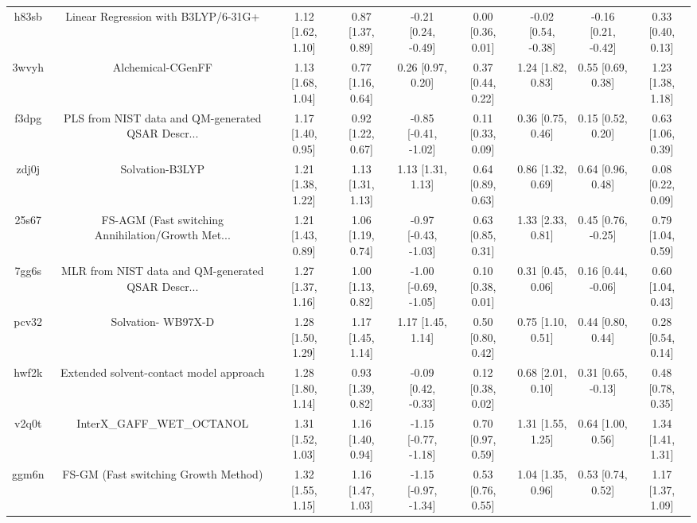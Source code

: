 \documentclass{article}
\begin{document}
\begin{center}
\begin{longtable}{|ccccccccc|}
 h83sb &                Linear Regression with B3LYP/6-31G+ &  1.12 [1.62, 1.10] &  0.87 [1.37, 0.89] &   -0.21 [0.24, -0.49] &  0.00 [0.36, 0.01] &   -0.02 [0.54, -0.38] &   -0.16 [0.21, -0.42] &     0.33 [0.40, 0.13] \\
 3wvyh &                                  Alchemical-CGenFF &  1.13 [1.68, 1.04] &  0.77 [1.16, 0.64] &     0.26 [0.97, 0.20] &  0.37 [0.44, 0.22] &     1.24 [1.82, 0.83] &     0.55 [0.69, 0.38] &     1.23 [1.38, 1.18] \\
 f3dpg &  PLS from NIST data and QM-generated QSAR Descr... &  1.17 [1.40, 0.95] &  0.92 [1.22, 0.67] &  -0.85 [-0.41, -1.02] &  0.11 [0.33, 0.09] &     0.36 [0.75, 0.46] &     0.15 [0.52, 0.20] &     0.63 [1.06, 0.39] \\
 zdj0j &                                    Solvation-B3LYP &  1.21 [1.38, 1.22] &  1.13 [1.31, 1.13] &     1.13 [1.31, 1.13] &  0.64 [0.89, 0.63] &     0.86 [1.32, 0.69] &     0.64 [0.96, 0.48] &     0.08 [0.22, 0.09] \\
 25s67 &  FS-AGM (Fast switching Annihilation/Growth Met... &  1.21 [1.43, 0.89] &  1.06 [1.19, 0.74] &  -0.97 [-0.43, -1.03] &  0.63 [0.85, 0.31] &     1.33 [2.33, 0.81] &    0.45 [0.76, -0.25] &     0.79 [1.04, 0.59] \\
 7gg6s &  MLR from NIST data and QM-generated QSAR Descr... &  1.27 [1.37, 1.16] &  1.00 [1.13, 0.82] &  -1.00 [-0.69, -1.05] &  0.10 [0.38, 0.01] &     0.31 [0.45, 0.06] &    0.16 [0.44, -0.06] &     0.60 [1.04, 0.43] \\
 pcv32 &                                 Solvation- WB97X-D &  1.28 [1.50, 1.29] &  1.17 [1.45, 1.14] &     1.17 [1.45, 1.14] &  0.50 [0.80, 0.42] &     0.75 [1.10, 0.51] &     0.44 [0.80, 0.44] &     0.28 [0.54, 0.14] \\
 hwf2k &            Extended solvent-contact model approach &  1.28 [1.80, 1.14] &  0.93 [1.39, 0.82] &   -0.09 [0.42, -0.33] &  0.12 [0.38, 0.02] &     0.68 [2.01, 0.10] &    0.31 [0.65, -0.13] &     0.48 [0.78, 0.35] \\
 v2q0t &                         InterX\_GAFF\_WET\_OCTANOL &  1.31 [1.52, 1.03] &  1.16 [1.40, 0.94] &  -1.15 [-0.77, -1.18] &  0.70 [0.97, 0.59] &     1.31 [1.55, 1.25] &     0.64 [1.00, 0.56] &     1.34 [1.41, 1.31] \\
 ggm6n &               FS-GM (Fast switching Growth Method) &  1.32 [1.55, 1.15] &  1.16 [1.47, 1.03] &  -1.15 [-0.97, -1.34] &  0.53 [0.76, 0.55] &     1.04 [1.35, 0.96] &     0.53 [0.74, 0.52] &     1.17 [1.37, 1.09] \\

\end{longtable}
\end{center}
\end{document}
